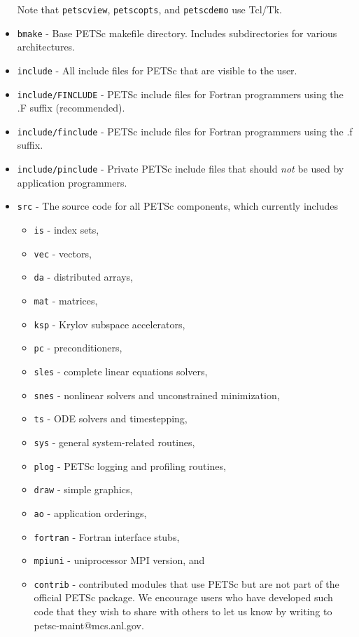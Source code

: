 \begin{itemize}
Note that {\tt petscview}, {\tt petscopts}, and {\tt petscdemo} use Tcl/Tk.
\item {\tt bmake} - Base PETSc makefile directory.  Includes subdirectories
                    for various architectures.
\item {\tt include} - All include files for PETSc that are visible to the user.
\item {\tt include/FINCLUDE} - PETSc include files for Fortran programmers using 
                               the .F suffix (recommended).
\item {\tt include/finclude} - PETSc include files for Fortran programmers using 
                               the .f suffix.
\item {\tt include/pinclude} - Private PETSc include files that should {\em not} be used by application programmers.
\item {\tt src} - The source code for all PETSc components, which
                  currently includes
 \begin{itemize}
 \item {\tt is} - index sets,
 \item {\tt vec} - vectors,
 \item {\tt da} - distributed arrays,
 \item {\tt mat} - matrices,
 \item {\tt ksp} - Krylov subspace accelerators,
 \item {\tt pc} - preconditioners,
 \item {\tt sles} - complete linear equations solvers,
 \item {\tt snes} - nonlinear solvers and unconstrained minimization,
 \item {\tt ts} - ODE solvers and timestepping,
 \item {\tt sys} - general system-related routines,
 \item {\tt plog} - PETSc logging and profiling routines,
 \item {\tt draw} - simple graphics,
 \item {\tt ao} - application orderings,
 \item {\tt fortran} - Fortran interface stubs,
 \item {\tt mpiuni} - uniprocessor MPI version, and
 \item {\tt contrib} - contributed modules that use PETSc but are not
    part of the official PETSc package.  We encourage users who have
    developed such code that they wish to share with others to let us
    know by writing to petsc-maint@mcs.anl.gov.
 \end{itemize}
\end{itemize}

